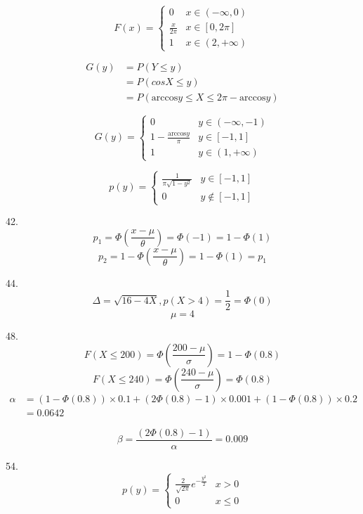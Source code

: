 \documentclass[10pt, a4paper,twocolumn]{article}
\begin{document}
    $$
        F(x) = 
        \begin{cases}
            0 & x \in (-\infty, 0) \\
            \frac{x}{2\pi} & x \in [0, 2\pi] \\
            1 & x \in (2, +\infty)
        \end{cases}
    $$

    $$
        \begin{aligned}
            G(y) &= P(Y \leqslant y) \\
                &= P(cosX \leqslant y) \\ 
                &= P(\text{arccos}y \leqslant X \leqslant 2\pi - \text{arccos}y)
        \end{aligned}
    $$

    $$
        G(y) = 
        \begin{cases}
            0 & y \in (-\infty, -1) \\
            1 - \frac{\text{arccos}y}{\pi} & y \in [-1, 1] \\ 
            1 & y \in (1, +\infty)
        \end{cases}
    $$

    $$
        p(y) = 
        \begin{cases}
            \frac{1}{\pi\sqrt{1 - y^2}} & y \in [-1, 1] \\
            0 & y \notin [-1, 1]
        \end{cases}
    $$

42. 
$$p_1 = \Phi(\frac{x - \mu}{\theta}) = \Phi(-1) = 1 - \Phi(1)$$
$$p_2 = 1 - \Phi(\frac{x - \mu}{\theta}) = 1 - \Phi(1) = p_1 $$

44.
$$\Delta = \sqrt{16 - 4X}, p(X > 4) = \frac{1}{2} = \Phi(0)$$
$$\mu = 4$$

48.
$$F(X \leqslant 200) = \Phi(\frac{200 - \mu}{\sigma}) = 1 -\Phi(0.8)$$
$$F(X \leqslant 240) = \Phi(\frac{240 - \mu}{\sigma}) = \Phi(0.8)$$
$$\begin{aligned}
    \alpha &= (1 - \Phi(0.8)) \times 0.1 + (2\Phi(0.8) - 1) \times 0.001 + (1 - \Phi(0.8)) \times 0.2 \\
    &= 0.0642
\end{aligned}
        $$

$$\beta = \frac{(2\Phi(0.8) - 1)}{\alpha} = 0.009$$

54.
$$p(y) = \begin{cases}
    \frac{2}{\sqrt{2\pi}}e^{-\frac{y^2}{2}} & x > 0 \\
    0 & x \leqslant 0
\end{cases}$$
\end{document}
